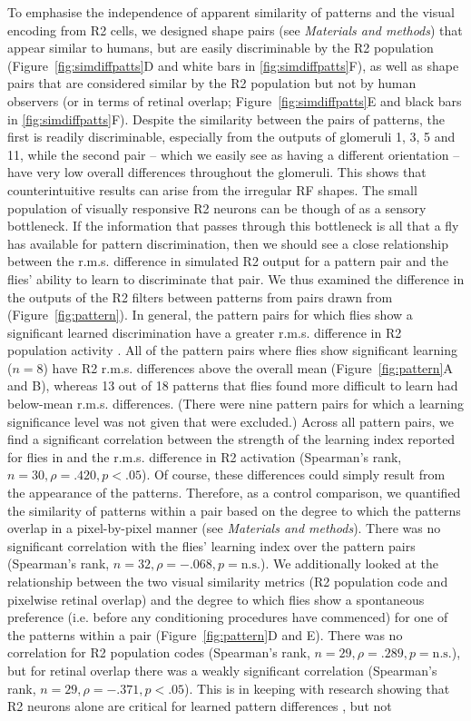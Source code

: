 To emphasise the independence of apparent similarity of patterns and the visual encoding from R2 cells, we designed shape pairs (see \emph{Materials and methods}) that appear similar to humans, but are easily discriminable by the R2 population (Figure~\ref{fig:simdiffpatts}D and white bars in \ref{fig:simdiffpatts}F), as well as shape pairs that are considered similar by the R2 population but not by human observers (or in terms of retinal overlap; Figure~\ref{fig:simdiffpatts}E and black bars in \ref{fig:simdiffpatts}F). Despite the similarity between the pairs of patterns, the first is readily discriminable, especially from the outputs of glomeruli 1, 3, 5 and 11, while the second pair – which we easily see as having a different orientation – have very low overall differences throughout the glomeruli. This shows that counterintuitive results can arise from the irregular RF shapes. The small population of visually responsive R2 neurons can be though of as a sensory bottleneck. If the information that passes through this bottleneck is all that a fly has available for pattern discrimination, then we should see a close relationship between the r.m.s. difference in simulated R2 output for a pattern pair and the flies’ ability to learn to discriminate that pair. We thus examined the difference in the outputs of the R2 filters between patterns from pairs drawn from \cite{Ernst1999} (Figure~\ref{fig:pattern}). In general, the pattern pairs for which flies show a significant learned discrimination have a greater r.m.s. difference in R2 population activity \cite{Ernst1999}. All of the pattern pairs where flies show significant learning ($n = 8$) have R2 r.m.s. differences above the overall mean (Figure~\ref{fig:pattern}A and B), whereas 13 out of 18 patterns that flies found more difficult to learn had below-mean r.m.s. differences. (There were nine pattern pairs for which a learning significance level was not given that were excluded.) Across all pattern pairs, we find a significant correlation between the strength of the learning index reported for flies in \cite{Ernst1999} and the r.m.s. difference in R2 activation (Spearman’s rank, $n = 30, \rho = .420, p < .05$). Of course, these differences could simply result from the appearance of the patterns. Therefore, as a control comparison, we quantified the similarity of patterns within a pair based on the degree to which the patterns overlap in a pixel-by-pixel manner (see \emph{Materials and methods}). There was no significant correlation with the flies’ learning index over the pattern pairs (Spearman’s rank, $n = 32, \rho = -.068, p = \mathrm{n.s.}$). We additionally looked at the relationship between the two visual similarity metrics (R2 population code and pixelwise retinal overlap) and the degree to which flies show a spontaneous preference (i.e. before any conditioning procedures have commenced) for one of the patterns within a pair (Figure~\ref{fig:pattern}D and E). There was no correlation for R2 population codes (Spearman's rank, $n = 29, \rho = .289, p = \mathrm{n.s.}$), but for retinal overlap there was a weakly significant correlation (Spearman's rank, $n = 29, \rho = -.371, p < .05$). This is in keeping with research showing that R2 neurons alone are critical for learned pattern differences \cite{Ernst1999}, but not 